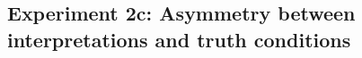 \documentclass{pnastwo}
\begin{document}
\begin{article}
\begin{materials}

\subsection{Experiment 2c: Asymmetry between interpretations and truth conditions}
%
%
%

\end{materials}
\end{article}
\end{document}
